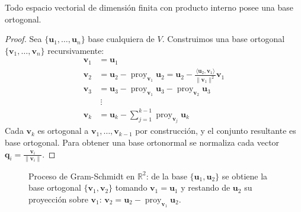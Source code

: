 \begin{theorem}\label{thm:cap07:gram-schmidt}
Todo espacio vectorial de dimensión finita con producto interno posee una base ortogonal.
\begin{proof}
Sea $\{ \mathbf{u}_1, \dots, \mathbf{u}_n \}$ base cualquiera de $V$. Construimos una base ortogonal $\{ \mathbf{v}_1, \dots, \mathbf{v}_n \}$ recursivamente:
\begin{align*}
\mathbf{v}_1 &= \mathbf{u}_1 \\
\mathbf{v}_2 &= \mathbf{u}_2 - \operatorname{proy}_{\mathbf{v}_1} \mathbf{u}_2 = \mathbf{u}_2 - \frac{\langle \mathbf{u}_2, \mathbf{v}_1 \rangle}{\|\mathbf{v}_1\|^2} \mathbf{v}_1 \\
\mathbf{v}_3 &= \mathbf{u}_3 - \operatorname{proy}_{\mathbf{v}_1} \mathbf{u}_3 - \operatorname{proy}_{\mathbf{v}_2} \mathbf{u}_3 \\
&\ \vdots \\
\mathbf{v}_k &= \mathbf{u}_k - \sum_{j=1}^{k-1} \operatorname{proy}_{\mathbf{v}_j} \mathbf{u}_k
\end{align*}
Cada $\mathbf{v}_k$ es ortogonal a $\mathbf{v}_1, \dots, \mathbf{v}_{k-1}$ por construcción, y el conjunto resultante es base ortogonal. Para obtener una base ortonormal se normaliza cada vector \(\mathbf{q}_i = \frac{\mathbf{v}_i}{\|\mathbf{v}_i\|}.\)
\end{proof}
\end{theorem}

\begin{figure}[!htbp]
\centering
{}
\caption{Proceso de Gram-Schmidt en $\mathbb{R}^2$: de la base $\{\mathbf{u}_1,\mathbf{u}_2\}$ se obtiene la base ortogonal $\{\mathbf{v}_1,\mathbf{v}_2\}$ tomando $\mathbf{v}_1=\mathbf{u}_1$ y restando de $\mathbf{u}_2$ su proyección sobre $\mathbf{v}_1$: $\mathbf{v}_2=\mathbf{u}_2-\operatorname{proy}_{\mathbf{v}_1}\mathbf{u}_2$.}
\label{fig:gram_schmidt_r2}
\end{figure}


